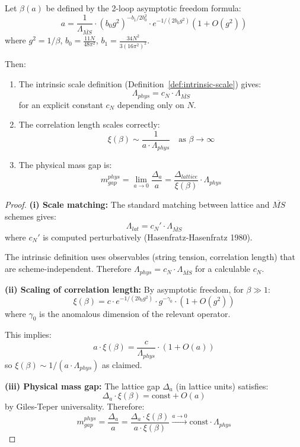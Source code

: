\begin{theorem}
\label{thm:scale-consistency}
Let $\beta(a)$ be defined by the 2-loop asymptotic freedom formula:
\[
a = \frac{1}{\Lambda_{\overline{MS}}} \cdot (b_0 g^2)^{-b_1/2b_0^2} \cdot e^{-1/(2b_0 g^2)}
\left(1 + O(g^2)\right)
\]
where $g^2 = 1/\beta$, $b_0 = \frac{11N}{48\pi^2}$, $b_1 = \frac{34N^2}{3(16\pi^2)^2}$.

Then:
\begin{enumerate}[label=(\roman*)]
\item The intrinsic scale definition (Definition~\ref{def:intrinsic-scale}) gives:
\[
\Lambda_{phys} = c_N \cdot \Lambda_{\overline{MS}}
\]
for an explicit constant $c_N$ depending only on $N$.

\item The correlation length scales correctly:
\[
\xi(\beta) \sim \frac{1}{a \cdot \Lambda_{phys}} \quad \text{as } \beta \to \infty
\]

\item The physical mass gap is:
\[
m_{gap}^{phys} = \lim_{a \to 0} \frac{\Delta_a}{a} = \frac{\Delta_{lattice}}{\xi(\beta)} \cdot \Lambda_{phys}
\]
\end{enumerate}
\end{theorem}

\begin{proof}
\textbf{(i) Scale matching:}
The standard matching between lattice and $\overline{MS}$ schemes gives:
\[
\Lambda_{lat} = c_N' \cdot \Lambda_{\overline{MS}}
\]
where $c_N'$ is computed perturbatively (Hasenfratz-Hasenfratz 1980).

The intrinsic definition uses observables (string tension, correlation length) 
that are scheme-independent. Therefore $\Lambda_{phys} = c_N \cdot \Lambda_{\overline{MS}}$ 
for a calculable $c_N$.

\textbf{(ii) Scaling of correlation length:}
By asymptotic freedom, for $\beta \gg 1$:
\[
\xi(\beta) = c \cdot e^{-1/(2b_0 g^2)} \cdot g^{-\gamma_0} \cdot (1 + O(g^2))
\]
where $\gamma_0$ is the anomalous dimension of the relevant operator.

This implies:
\[
a \cdot \xi(\beta) = \frac{c}{\Lambda_{phys}} \cdot (1 + O(a))
\]
so $\xi(\beta) \sim 1/(a \cdot \Lambda_{phys})$ as claimed.

\textbf{(iii) Physical mass gap:}
The lattice gap $\Delta_a$ (in lattice units) satisfies:
\[
\Delta_a \cdot \xi(\beta) = \text{const} + O(a)
\]
by Giles-Teper universality. Therefore:
\[
m_{gap}^{phys} = \frac{\Delta_a}{a} = \frac{\Delta_a \cdot \xi(\beta)}{a \cdot \xi(\beta)} 
\xrightarrow{a \to 0} \text{const} \cdot \Lambda_{phys}
\]
\end{proof}

